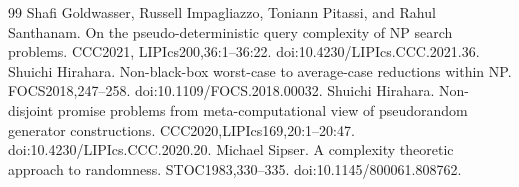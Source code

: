 \documentclass[10pt,a4paper]{article}
\begin{document}
\begin{thebibliography}{99}
 Shafi Goldwasser, Russell Impagliazzo, Toniann Pitassi, and Rahul Santhanam. On the pseudo-deterministic query complexity of NP search problems. CCC2021, LIPIcs200,36:1--36:22. doi:10.4230/LIPIcs.CCC.2021.36.
 Shuichi Hirahara. Non-black-box worst-case to average-case reductions within NP. FOCS2018,247--258. doi:10.1109/FOCS.2018.00032.
 Shuichi Hirahara. Non-disjoint promise problems from meta-computational view of pseudorandom generator constructions. CCC2020,LIPIcs169,20:1--20:47. doi:10.4230/LIPIcs.CCC.2020.20.
 Michael Sipser. A complexity theoretic approach to randomness. STOC1983,330--335. doi:10.1145/800061.808762.
\end{thebibliography}
\end{document}
